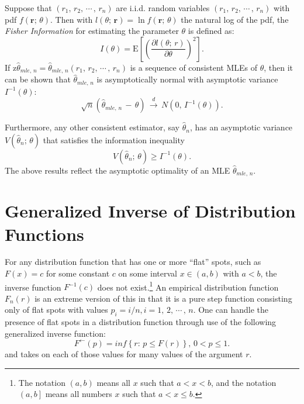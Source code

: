 \documentclass[graybox,envcountchap,sectrefs]{svmono}\usepackage[]{graphicx}\usepackage[]{xcolor}
\begin{document}
\begin{appendices}
Suppose that $(r_{1},\,r_{2},\,\cdots\,,\,r_{n})$ are i.i.d. random
variables $(r_{1},\,r_{2},\,\cdots\,,\,r_{n})$ with pdf $f(\mathbf{r};\,\theta)$.
Then with $l(\theta;\,\mathbf{r})=\ln f(\mathbf{r};\,\theta)$ the
natural log of the pdf, the \emph{Fisher Information} for estimating
the parameter $\theta$ is defined as:
\begin{equation}
I(\theta)=\mathrm{E}\left[\left(\dfrac{\partial l(\theta;\,r)}{\partial\theta}\right)^{2}\right].\label{eq: FisherInfo}
\end{equation}
If z$\hat{\theta}_{mle,\,n}=\hat{\theta}_{mle,\,n}(r_{1},\,r_{2},\,\cdots\,,\,r_{n})$
is a sequence of consistent MLEs of $\theta$, then it can be shown
that $\hat{\theta}_{mle,\,n}$ is asymptotically normal with asymptotic
variance $I^{-1}(\theta)$:
\begin{equation}
\sqrt{n}\left(\hat{\theta}_{mle,\,n}\,-\,\theta\right)\,\overset{d}{\rightarrow}\,N\left(0,\,I^{-1}(\theta)\right).
\end{equation}

Furthermore, any other consistent estimator, say $\hat{\theta}_{n}$,
has an asymptotic variance $V\left(\hat{\theta}_{n};\,\theta\right)$
that satisfies the information inequality
\begin{equation}
V\left(\hat{\theta}_{n};\,\theta\right)\geqslant I^{-1}(\theta).\label{eq: asympInfoInequality}
\end{equation}
The above results reflect the asymptotic optimality of an MLE $\hat{\theta}_{mle,\,n}$.

\section{Generalized Inverse of Distribution Functions \label{sec:Generalized-Inverse-of Distribution Function}}

For any distribution function that has one or more ``flat'' spots,
such as $F(x)=c$ for some constant $c$ on some interval $x\in(a,b)$
with $a<b$, the inverse function $F^{-1}(c)$ does not exist.\footnote{The notation $(a,b)$ means all $x$ such that $a<x<b$, and the notation
$\left(a,b\right]$ means all numbers $x$ such that $a<x\leqslant b$.} An empirical distribution function $F_{n}(r)$ is an extreme version
of this in that it is a pure step function consisting only of flat
spots with values $p_{i}=i/n,i=1,\,2,\,\cdots\,,\,n$. One can handle
the presence of flat spots in a distribution function through use
of the following generalized inverse function:
\begin{equation}
F^{\leftarrow}(p)=inf\left\{ r:\,p\leqslant F(r)\right\} ,\,0<p\leqslant1.\label{eq: ginverseDF}
\end{equation}
and takes on each of those values for many values of the argument
$r$.


\end{appendices}
\end{document}
